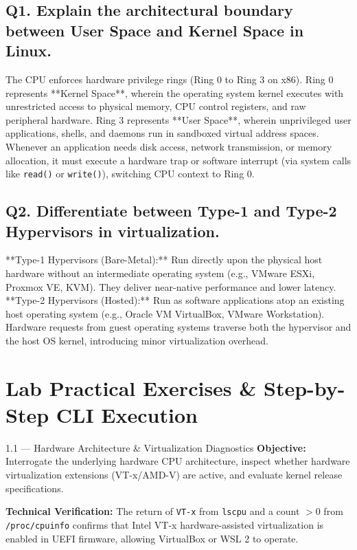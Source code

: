 \subsection*{Q1. Explain the architectural boundary between User Space and Kernel Space in Linux.}
\begin{vivasol}
The CPU enforces hardware privilege rings (Ring 0 to Ring 3 on x86). Ring 0 represents **Kernel Space**, wherein the operating system kernel executes with unrestricted access to physical memory, CPU control registers, and raw peripheral hardware. Ring 3 represents **User Space**, wherein unprivileged user applications, shells, and daemons run in sandboxed virtual address spaces. Whenever an application needs disk access, network transmission, or memory allocation, it must execute a hardware trap or software interrupt (via system calls like \texttt{read()} or \texttt{write()}), switching CPU context to Ring 0.
\end{vivasol}

\subsection*{Q2. Differentiate between Type-1 and Type-2 Hypervisors in virtualization.}
\begin{vivasol}
**Type-1 Hypervisors (Bare-Metal):** Run directly upon the physical host hardware without an intermediate operating system (e.g., VMware ESXi, Proxmox VE, KVM). They deliver near-native performance and lower latency.
**Type-2 Hypervisors (Hosted):** Run as software applications atop an existing host operating system (e.g., Oracle VM VirtualBox, VMware Workstation). Hardware requests from guest operating systems traverse both the hypervisor and the host OS kernel, introducing minor virtualization overhead.
\end{vivasol}

\section{Lab Practical Exercises \& Step-by-Step CLI Execution}

\begin{practicalbox}{1.1 --- Hardware Architecture \& Virtualization Diagnostics}
\textbf{Objective:} Interrogate the underlying hardware CPU architecture, inspect whether hardware virtualization extensions (VT-x/AMD-V) are active, and evaluate kernel release specifications.
\textbf{Technical Verification:} The return of \texttt{VT-x} from \texttt{lscpu} and a count $>0$ from \texttt{/proc/cpuinfo} confirms that Intel VT-x hardware-assisted virtualization is enabled in UEFI firmware, allowing VirtualBox or WSL 2 to operate.
\end{practicalbox}
